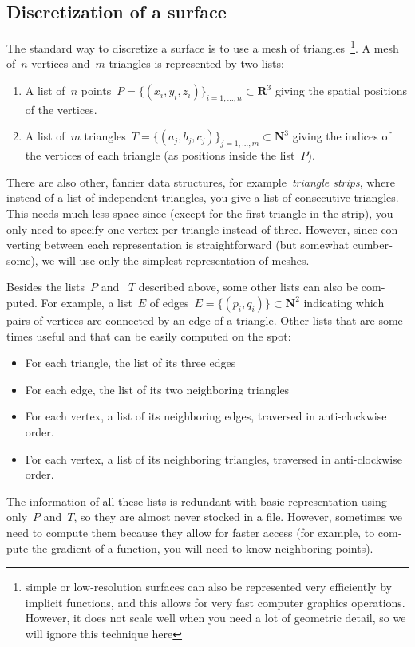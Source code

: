 \documentclass{article}
\def\R{\mathbf{R}} %
\def\N{\mathbf{N}} %
\begin{document}
\begin{otherlanguage}{british}
\subsection{Discretization of a surface}

The standard way to discretize a surface is to use a mesh of
triangles~\footnote{simple or low-resolution surfaces can also be represented
very efficiently by implicit functions, and this allows for very fast
computer graphics operations.  However, it does not scale well when you need a
lot of geometric detail, so we will ignore this technique here}.
A mesh of~$n$ vertices and~$m$ triangles is represented by two lists:
\begin{enumerate}
	\item A list of~$n$ points~$P=\{(x_i,y_i,z_i)\}_{i=1,\ldots,
		n}\subset\R^3$ giving the spatial positions of the vertices.
	\item A list of~$m$ triangles~$T=\{(a_j,b_j,c_j)\}_{j=1,\ldots,
		m}\subset\N^3$ giving the indices of the vertices of each
		triangle (as positions inside the list~$P$).
\end{enumerate}

There are also other, fancier data structures, for example~\emph{triangle
strips}, where instead of a list of independent triangles, you give a list of
consecutive triangles.  This needs much less space since (except for the
first triangle in the strip), you only need to specify one vertex per
triangle instead of three.  However, since converting between each
representation is straightforward (but somewhat cumbersome), we will use only
the simplest representation of meshes.

Besides the lists~$P$ and ~$T$ described above, some other lists can also be
computed.  For example, a list~$E$ of edges~$E=\{(p_i,q_i)\}\subset\N^2$
indicating which pairs of vertices are connected by an edge of a triangle.
Other lists that are sometimes useful and that can be easily computed on the
spot:
\begin{itemize}
	\item For each triangle, the list of its three edges
	\item For each edge, the list of its two neighboring triangles
	\item For each vertex, a list of its neighboring edges, traversed in
		anti-clockwise order.
	\item For each vertex, a list of its neighboring triangles, traversed in
		anti-clockwise order.
\end{itemize}
The information of all these lists is redundant with basic representation
using only~$P$ and~$T$, so they are almost never stocked in a file.  However,
sometimes we need to compute them because they allow for faster access (for
example, to compute the gradient of a function, you will need to know
neighboring points).


\end{otherlanguage}
\end{document}

